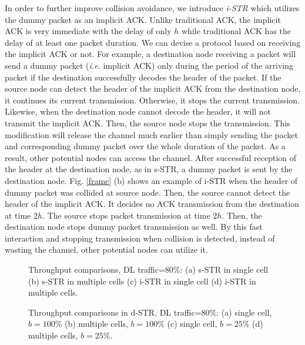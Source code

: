 \documentclass[twocolumn]{IEEEtran}
\begin{document}
In order to further improve collision avoidance, we introduce
\textit{i-STR} which utilizes the dummy packet as an implicit ACK.
Unlike traditional ACK, the implicit ACK is very immediate with the
delay of only $h$ while traditional ACK has the delay of at least
one packet duration. We can devise a protocol based on receiving the
implicit ACK or not. For example, a destination node receiving a
packet will send a dummy packet (\textit{i.e.} implicit ACK) only
during the period of the arriving packet if the destination
successfully decodes the header of the packet. If the source node
can detect the header of the implicit ACK from the destination node,
it continues its current transmission. Otherwise, it stops the
current transmission. Likewise, when the destination node cannot
decode the header, it will not transmit the implicit ACK. Then, the
source node stops the transmission. This modification will release
the channel much earlier than simply sending the packet and
corresponding dummy packet over the whole duration of the packet. As
a result, other potential nodes can access the channel. After
successful reception of the header at the destination node, as in
s-STR, a dummy packet is sent by the destination node. Fig.
\ref{frame} (b) shows an example of i-STR when the header of dummy
packet was collided at source node. Then, the source cannot detect
the header of the implicit ACK. It decides no ACK transmission from
the destination at time $2h$. The source stops packet transmission
at time $2h$. Then, the destination node stops dummy packet
transmission as well. By this fast interaction and stopping
transmission when collision is detected, instead of wasting the
channel, other potential nodes can utilize it.

\begin{figure*}[!t]

\centerline{ 
\hfil {}
} \centerline{ 
\hfil {}}

\caption{Throughput comparisons, DL traffic=80\%: (a) s-STR in
single cell (b) s-STR in multiple cells (c) i-STR in single cell (d)
i-STR in multiple cells. } \label{fig_s_i_STR}

\end{figure*}

\begin{figure*}[!ht]

\centerline{ 
\hfil {}
} \centerline{ 
\hfil {}}

\caption{Throughput comparisons in d-STR, DL traffic=80\%: (a)
single cell, $b=100\%$ (b) multiple cells, $b=100\%$ (c) single
cell, $b=25\%$ (d) multiple cells, $b=25\%$. } \label{fig_d_STR}

\end{figure*}
\end{document}
